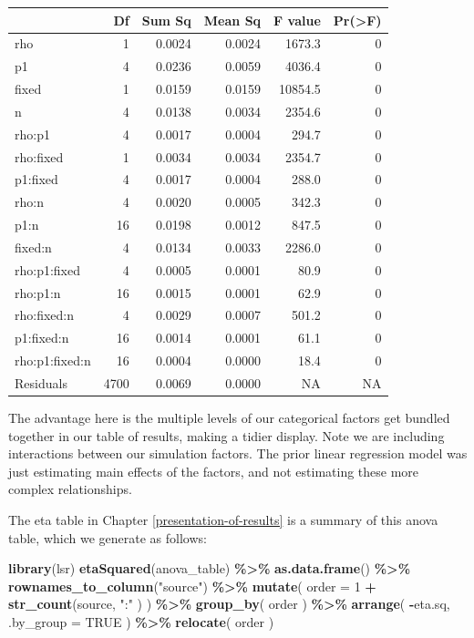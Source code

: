 \documentclass[
]{book}
\newenvironment{Shaded}{\begin{snugshade}}{\end{snugshade}}
\newcommand{\AttributeTok}[1]{\textcolor[rgb]{0.13,0.29,0.53}{#1}}
\newcommand{\ConstantTok}[1]{\textcolor[rgb]{0.56,0.35,0.01}{#1}}
\newcommand{\DecValTok}[1]{\textcolor[rgb]{0.00,0.00,0.81}{#1}}
\newcommand{\FunctionTok}[1]{\textcolor[rgb]{0.13,0.29,0.53}{\textbf{#1}}}
\newcommand{\NormalTok}[1]{#1}
\newcommand{\SpecialCharTok}[1]{\textcolor[rgb]{0.81,0.36,0.00}{\textbf{#1}}}
\newcommand{\StringTok}[1]{\textcolor[rgb]{0.31,0.60,0.02}{#1}}
\begin{document}
\begin{tabular}{l|r|r|r|r|r}
\hline
  & Df & Sum Sq & Mean Sq & F value & Pr(>F)\\
\hline
rho & 1 & 0.0024 & 0.0024 & 1673.3 & 0\\
\hline
p1 & 4 & 0.0236 & 0.0059 & 4036.4 & 0\\
\hline
fixed & 1 & 0.0159 & 0.0159 & 10854.5 & 0\\
\hline
n & 4 & 0.0138 & 0.0034 & 2354.6 & 0\\
\hline
rho:p1 & 4 & 0.0017 & 0.0004 & 294.7 & 0\\
\hline
rho:fixed & 1 & 0.0034 & 0.0034 & 2354.7 & 0\\
\hline
p1:fixed & 4 & 0.0017 & 0.0004 & 288.0 & 0\\
\hline
rho:n & 4 & 0.0020 & 0.0005 & 342.3 & 0\\
\hline
p1:n & 16 & 0.0198 & 0.0012 & 847.5 & 0\\
\hline
fixed:n & 4 & 0.0134 & 0.0033 & 2286.0 & 0\\
\hline
rho:p1:fixed & 4 & 0.0005 & 0.0001 & 80.9 & 0\\
\hline
rho:p1:n & 16 & 0.0015 & 0.0001 & 62.9 & 0\\
\hline
rho:fixed:n & 4 & 0.0029 & 0.0007 & 501.2 & 0\\
\hline
p1:fixed:n & 16 & 0.0014 & 0.0001 & 61.1 & 0\\
\hline
rho:p1:fixed:n & 16 & 0.0004 & 0.0000 & 18.4 & 0\\
\hline
Residuals & 4700 & 0.0069 & 0.0000 & NA & NA\\
\hline
\end{tabular}

The advantage here is the multiple levels of our categorical factors get bundled together in our table of results, making a tidier display.
Note we are including interactions between our simulation factors.
The prior linear regression model was just estimating main effects of the factors, and not estimating these more complex relationships.

The eta table in Chapter \ref{presentation-of-results} is a summary of this anova table, which we generate as follows:

\begin{Shaded}
\begin{Highlighting}[]
\FunctionTok{library}\NormalTok{(lsr)}
\FunctionTok{etaSquared}\NormalTok{(anova\_table) }\SpecialCharTok{\%\textgreater{}\%}
  \FunctionTok{as.data.frame}\NormalTok{() }\SpecialCharTok{\%\textgreater{}\%}
  \FunctionTok{rownames\_to\_column}\NormalTok{(}\StringTok{"source"}\NormalTok{) }\SpecialCharTok{\%\textgreater{}\%}
  \FunctionTok{mutate}\NormalTok{( }\AttributeTok{order =} \DecValTok{1} \SpecialCharTok{+} \FunctionTok{str\_count}\NormalTok{(source, }\StringTok{":"}\NormalTok{ ) ) }\SpecialCharTok{\%\textgreater{}\%}
  \FunctionTok{group\_by}\NormalTok{( order ) }\SpecialCharTok{\%\textgreater{}\%}
  \FunctionTok{arrange}\NormalTok{( }\SpecialCharTok{{-}}\NormalTok{eta.sq, }\AttributeTok{.by\_group =} \ConstantTok{TRUE}\NormalTok{ ) }\SpecialCharTok{\%\textgreater{}\%}
  \FunctionTok{relocate}\NormalTok{( order ) }
\end{Highlighting}
\end{Shaded}
\end{document}
